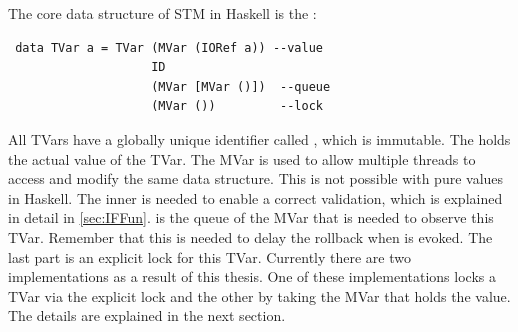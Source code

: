 The core data structure of STM in Haskell is the :
\begin{lstlisting}
 data TVar a = TVar (MVar (IORef a)) --value
                    ID
                    (MVar [MVar ()])  --queue
                    (MVar ())         --lock
\end{lstlisting}
All TVars have a globally unique identifier called , which is immutable. The  
holds the actual value of the TVar. The MVar is used to allow multiple threads to access and modify the same 
data structure. This is not possible with pure values in Haskell. The inner  is needed to enable a 
correct validation, which is explained in detail
in \ref{sec:IFFun}.  is the queue of the MVar that is needed to observe this TVar. 
Remember that this is needed to delay the rollback when 
is evoked. The last part is an explicit lock for this TVar. Currently there are two implementations as 
a result of this thesis. One of these implementations locks a TVar via 
the explicit lock and the other by taking the MVar that holds the value. The details are explained in the next section. 

